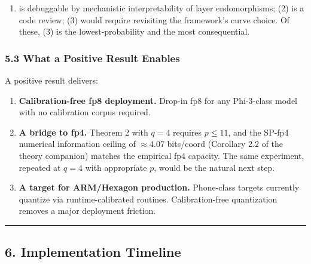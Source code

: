 \documentclass[
  11pt,
]{article}
\providecommand{\tightlist}{%
  \setlength{\itemsep}{0pt}\setlength{\parskip}{0pt}}
\begin{document}
\begin{enumerate}
\def\labelenumi{(\arabic{enumi})}
\tightlist
\item
  is debuggable by mechanistic interpretability of layer endomorphisms;
  (2) is a code review; (3) would require revisiting the framework's
  curve choice. Of these, (3) is the lowest-probability and the most
  consequential.
\end{enumerate}

\hypertarget{what-a-positive-result-enables}{%
\subsubsection{5.3 What a Positive Result
Enables}\label{what-a-positive-result-enables}}

A positive result delivers:

\begin{enumerate}
\def\labelenumi{\arabic{enumi}.}
\tightlist
\item
  \textbf{Calibration-free fp8 deployment.} Drop-in fp8 for any
  Phi-3-class model with no calibration corpus required.
\item
  \textbf{A bridge to fp4.} Theorem 2 with \(q = 4\) requires
  \(p \leq 11\), and the SP-fp4 numerical information ceiling of
  \(\approx 4.07\) bits/coord (Corollary 2.2 of the theory companion)
  matches the empirical fp4 capacity. The same experiment, repeated at
  \(q = 4\) with appropriate \(p\), would be the natural next step.
\item
  \textbf{A target for ARM/Hexagon production.} Phone-class targets
  currently quantize via runtime-calibrated routines. Calibration-free
  quantization removes a major deployment friction.
\end{enumerate}

\begin{center}\rule{0.5\linewidth}{0.5pt}\end{center}

\hypertarget{implementation-timeline}{%
\subsection{6. Implementation Timeline}\label{implementation-timeline}}
\end{document}
